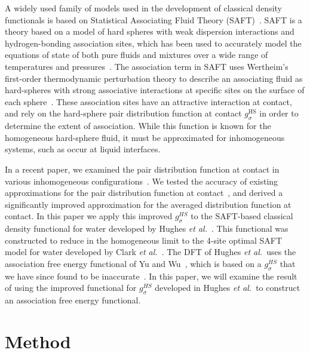 \documentclass[twocolumn,amsmath,amssymb,prl]{revtex4-1}
\newcommand\hughesetal{Hughes \emph{et al.}}
\begin{document}
A widely used family of models used in the development of classical
density functionals is based on Statistical Associating Fluid Theory
(SAFT)~\cite{chapman1989saft}.  SAFT is a theory based on a model of
hard spheres with weak dispersion interactions and hydrogen-bonding
association sites, which has been used to accurately model the
equations of state of both pure fluids and mixtures over a wide range
of temperatures and pressures~\cite{muller2001molecular,
  tan2008recent}.  The association term in SAFT uses Wertheim's
first-order thermodynamic perturbation theory to describe an
associating fluid as hard-spheres with strong associative interactions
at specific sites on the surface of each sphere~\cite{wertheim1984fluidsI,
  wertheim1984fluidsII, wertheim1986fluidsIII, wertheim1986fluidsIV}.
These association sites have an attractive interaction at contact, and
rely on the hard-sphere pair distribution function at contact
$g_\sigma^\text{HS}$ in order to determine the extent of association.
While this function is known for the homogeneous hard-sphere
fluid, it must be approximated for inhomogeneous systems, such as occur
at liquid interfaces.

In a recent paper, we examined the pair distribution function at
contact in various inhomogeneous
configurations~\cite{schulte2012using}.  We tested the accuracy of
existing approximations for the pair distribution function at
contact~\cite{yu2002fmt-dft-inhomogeneous-associating,
  gross2009density}, and derived a significantly improved
approximation for the averaged distribution function at contact.  In
this paper we apply this improved $g_\sigma^{HS}$ to the SAFT-based
classical density functional for water developed by Hughes \emph{et
  al.}~\cite{hughes2013classical}.  This functional was constructed to
reduce in the homogeneous limit to the 4-site optimal SAFT model for
water developed by Clark \emph{et al.}~\cite{clark2006developing}.
The DFT of \hughesetal\ uses the association free energy functional of
Yu and Wu~\cite{yu2002fmt-dft-inhomogeneous-associating}, which is
based on a $g_\sigma^{HS}$ that we have since found to be
inaccurate~\cite{schulte2012using}.  In this paper, we will examine
the result of using the improved functional for $g_\sigma^{HS}$
developed in \hughesetal\ to construct an association free energy
functional.

\section{Method}
\end{document}
